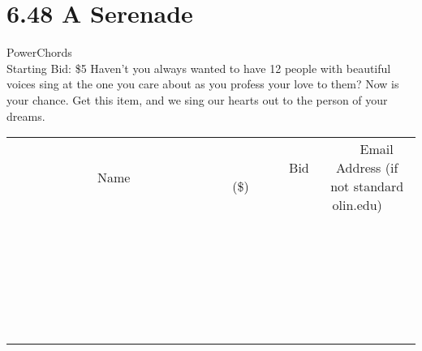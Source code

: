 \documentclass[11pt]{article}
\begin{document}
\section*{6.48 A Serenade}
PowerChords
\\
Starting Bid: \$5
\newline
Haven't you always wanted to have 12 people with beautiful voices sing at the one you care about as you profess your love to them? Now is your chance. Get this item, and we sing our hearts out to the person of your dreams.
\\[6ex]
\begin{tabular}{c c c}
~~~~~~~~~~~~~Name~~~~~~~~~~~~~ & ~~~~~~~~~Bid (\$)~~~~~~~~~  & ~~~Email Address (if not standard olin.edu)~~~\\
 & & \\
\hline
 & & \\
\hline
 & & \\
\hline
 & & \\
\hline
 & & \\
\hline
 & & \\
\hline
 & & \\
\hline
 & & \\
\hline
 & & \\
\hline
 & & \\
\hline
 & & \\
\hline
 & & \\
\hline
 & & \\
\hline
 & & \\
\hline
 & & \\
\hline
 & & \\
\hline
 & & \\
\hline
 & & \\
\hline
 & & \\
\hline
 & & \\
\hline
 & & \\
\hline
 & & \\
\hline
 & & \\
\hline
 & & \\
\hline
 & & \\
\hline
 & & \\
\hline
\end{tabular}
\newpage
\end{document}
